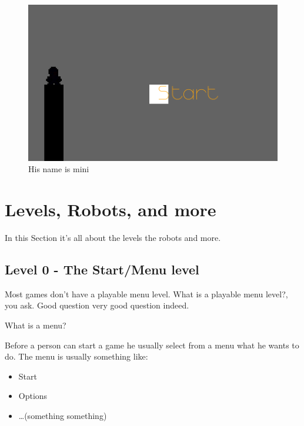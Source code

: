 \documentclass[twopages]{scrartcl}
\begin{document}
\begin{figure}
\begin{center}
\includegraphics{../output_md/assets/img/aar.png}
\end{center}
\caption{ His name is mini }

\end{figure}

\section{Levels, Robots, and more}\hypertarget{levels-robots-and-more}{}\label{levels-robots-and-more}

In this Section it's all about the levels the robots and more.

\subsection{Level 0 - The Start/Menu level}\hypertarget{level-0---the-startmenu-level}{}\label{level-0---the-startmenu-level}

Most games don't have a playable menu level. What is a playable menu level?, you ask.
Good question very good question indeed.

What is a menu?

Before a person can start a game he usually select from a menu what he wants
to do. The menu is usually something like:

\begin{itemize}
\item Start
\item Options
\item \ldots{}(something something)
\end{itemize}
\end{document}

